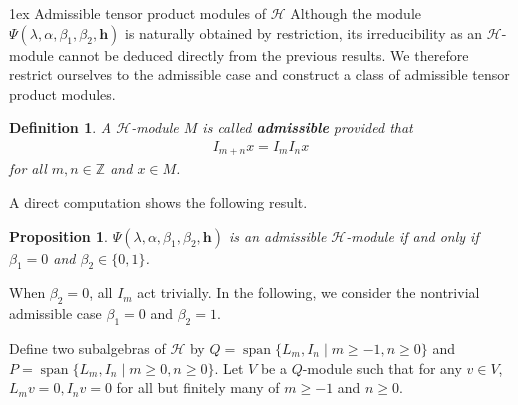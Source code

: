 \documentclass[a4paper]{amsart}
\makeatletter
\numberwithin{equation}{section}
\newtheorem{definition}[theorem]{Definition}
\newtheorem{proposition}[theorem]{Proposition}
\def\subsection{\@startsection{subsection}{2}%
  \z@{1.5ex \@plus .5ex \@minus .2ex}%
  {1ex}%
  {\normalfont\bfseries}}
\makeatother
\begin{document}
\subsection{Admissible tensor product modules of $\mathcal{H}$}
Although the module $\Psi(\lambda,\alpha,\beta_1,\beta_2,\mathbf h)$ is naturally obtained by restriction, its irreducibility as an $\mathcal{H}$-module cannot be deduced directly from the previous results. We therefore restrict ourselves to the admissible case and construct a class of admissible tensor product modules.
\begin{definition}
    A $\mathcal{H}$-module $M$ is called \textbf{admissible} provided that
\begin{align*}
I_{m+n}x = I_{m}I_{n}x
\end{align*}
for all $m,n \in \mathbb{Z}$ and $x \in M$.
\end{definition}
A direct computation shows the following result.
\begin{proposition}
    $\Psi(\lambda,\alpha,\beta_{1},\beta_{2},\mathbf{h})$ is an admissible $\mathcal{H}$-module if and only if $\beta_{1}=0$ and $\beta_{2}\in\{0,1\}$. 
\end{proposition}
When $\beta_2=0$, all $I_m$ act trivially. In the following, we
consider the nontrivial admissible case $\beta_1=0$ and $\beta_2=1$.

Define two subalgebras of $\mathcal{H}$ by $Q=\operatorname{span}\{L_{m},I_{n}\mid m\geq -1,n\geq 0\}$ and $P=\operatorname{span}\{L_{m},I_{n}\mid m\geq 0,n\geq 0\}$. Let $V$ be a $Q$-module such that for any $v\in V$, $L_{m}v=0, I_{n}v=0$ for all but finitely many of $m\geq -1$ and $n\geq0$. 
\end{document}
